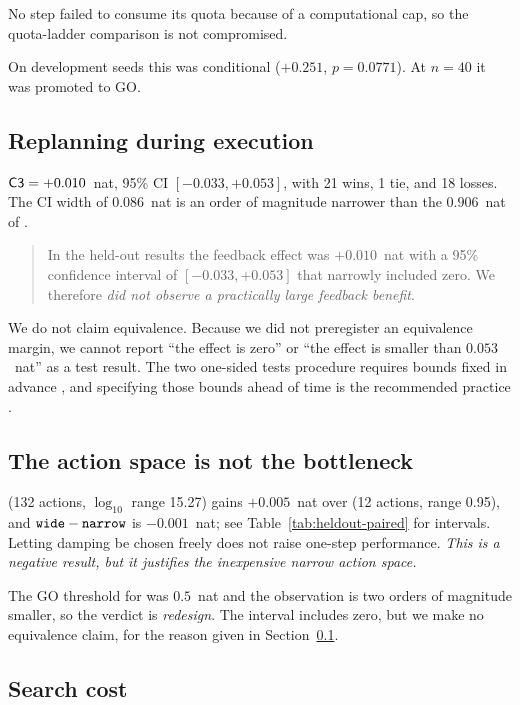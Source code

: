 No step failed to consume its quota because of a computational cap, so the
quota-ladder comparison is not compromised.

On development seeds this was conditional ($+0.251$, $p = 0.0771$). At $n = 40$ it
was promoted to GO.

\subsection{Replanning during execution}
\label{sec:c3}

$\textsf{C3} = +0.010$~nat, 95\% CI $[-0.033, +0.053]$, with 21 wins, 1 tie, and 18
losses. The CI width of $0.086$~nat is an order of magnitude narrower than the
$0.906$~nat of .

\begin{quote}
In the held-out results the feedback effect was $+0.010$~nat with a 95\%
confidence interval of $[-0.033, +0.053]$ that narrowly included zero. We
therefore \emph{did not observe a practically large feedback benefit}.
\end{quote}

We do not claim equivalence. Because we did not preregister an equivalence margin,
we cannot report ``the effect is zero'' or ``the effect is smaller than
$0.053$~nat'' as a test result. The two one-sided tests procedure requires bounds
fixed in advance \citep{schuirmann1987tost}, and specifying those bounds ahead of
time is the recommended practice \citep{lakens2017equivalence}.

\subsection{The action space is not the bottleneck}
\label{sec:actionspace}

 (132 actions, $\log_{10}$ range 15.27) gains $+0.005$~nat over
 (12 actions, range 0.95), and $\texttt{wide} - \texttt{narrow}$ is
$-0.001$~nat; see Table~\ref{tab:heldout-paired} for intervals. Letting damping be
chosen freely does not raise one-step performance. \emph{This is a negative result,
but it justifies the inexpensive narrow action space.}

The GO threshold for  was $0.5$~nat and the observation is two orders of
magnitude smaller, so the verdict is \emph{redesign}. The interval includes zero,
but we make no equivalence claim, for the reason given in Section~\ref{sec:c3}.

\subsection{Search cost}
\label{sec:cost}

\begin{table}[!ht]
  \centering
  
  \caption{Median decision-search cost on held-out instances, relative to the
  $150$~GE deployment budget. The reported headroom was obtained by an oracle that
  consumed $1{,}294$ times the deployment budget; Section~\ref{sec:cheap} discusses
  what that cost gap implies.}
  \label{tab:heldout-cost}
\end{table}
